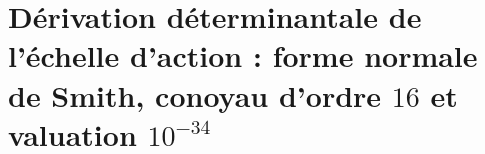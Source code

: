 \chapter{Dérivation déterminantale de l’échelle d’action : forme normale de Smith, conoyau d’ordre \(16\) et valuation \(10^{-34}\)}
\label{chap:p3-final:34:escala_accion}

